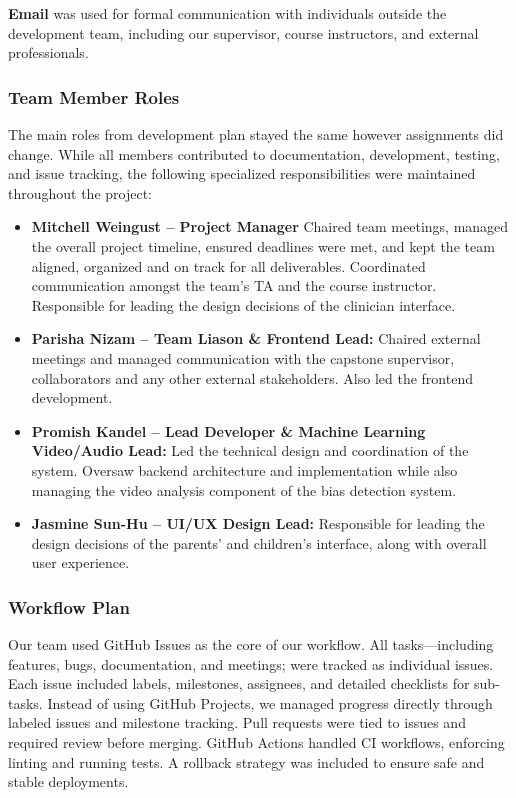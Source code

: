 \documentclass{article}
\begin{document}
\textbf{Email} was used for formal communication with individuals outside the development team, including our supervisor, course instructors, and external professionals.

\subsubsection{Team Member Roles}

\hspace{2em}The main roles from development plan stayed the same however assignments did change.
While all members contributed to documentation, development, testing, and issue tracking, the following specialized responsibilities were maintained throughout the project:

\begin{itemize}
    \item \textbf{Mitchell Weingust – Project Manager }  
    Chaired team meetings, managed the overall project timeline, ensured deadlines were met, and kept the team aligned, organized and on track for all deliverables. Coordinated communication amongst the team's TA and the course instructor.
    Responsible for leading the design decisions of the clinician interface.

    \item \textbf{Parisha Nizam – Team Liason \& Frontend Lead:}  
    Chaired external meetings and managed communication with the capstone supervisor, collaborators and any other external stakeholders. Also led the frontend development. 

    \item \textbf{Promish Kandel – Lead Developer \& Machine Learning Video/Audio Lead:}  
    Led the technical design and coordination of the system. Oversaw backend architecture and implementation while also managing the video analysis component of the bias detection system.

    \item \textbf{Jasmine Sun-Hu – UI/UX Design Lead:}  
    Responsible for leading the design decisions of the parents' and children's interface, along with overall user experience.
\end{itemize}

\subsubsection{Workflow Plan}

\hspace{2em}Our team used GitHub Issues as the core of our workflow. All tasks—including features, bugs, documentation, and meetings; were tracked as individual issues. 
Each issue included labels, milestones, assignees, and detailed checklists for sub-tasks. Instead of using GitHub Projects, we managed progress directly through labeled issues and milestone tracking. Pull requests were tied to issues and required review before merging. GitHub Actions handled CI workflows, enforcing linting and running tests. A rollback strategy was included to ensure safe and stable deployments.
\end{document}
